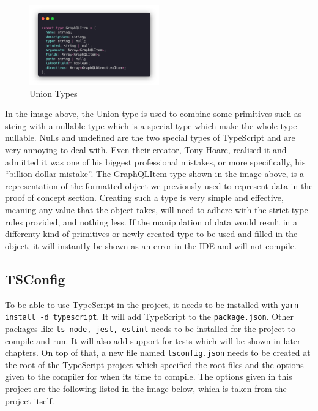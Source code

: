 \begin{figure}[H]
  \centering
  \includegraphics[width=0.5\textwidth]{figures/code/union-types.png}
  \caption{Union Types}
  \label{f:ch5-refactored-union-types}
\end{figure}

In the image above, the Union type is used to combine some primitives such as
string with a nullable type which is a special type which make the whole type
nullable. Nulls and undefined are the two special types of TypeScript and are
very annoying to deal with. Even their creator, Tony Hoare, realised it and
admitted it was one of his biggest professional mistakes, or more specifically,
his ``billion dollar mistake''. The GraphQLItem type shown in the image above,
is a representation of the formatted object we previously used to represent data
in the proof of concept section. Creating such a type is very simple and
effective, meaning any value that the object takes, will need to adhere with the
strict type rules provided, and nothing less. If the manipulation of data would
result in a differenty kind of primitives or newly created type to be used and
filled in the object, it will instantly be shown as an error in the IDE and will
not compile.

\subsection{TSConfig}
\label{ss:TSConfig}
To be able to use TypeScript in the project, it needs to be installed with
\texttt{yarn install -d typescript}. It will add TypeScript to the
\texttt{package.json}. Other packages like \texttt{ts-node, jest, eslint}
needs to be installed for the project to compile and run. It will also add
support for tests which will be shown in later chapters.
On top of that, a new file named \texttt{tsconfig.json} needs to be created at the
root of the TypeScript project which specified the root files and the options
given to the compiler for when its time to compile. The options given in this
project are the following listed in the image below, which is taken from the
project itself.

